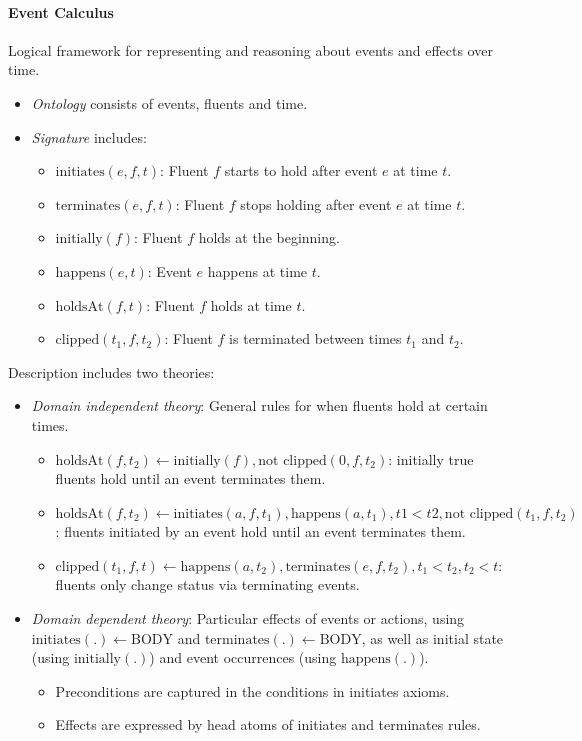 \documentclass[twocolumn,english]{article}
\begin{document}
\paragraph{Event Calculus}

Logical framework for representing and reasoning about events and
effects over time.
\begin{itemize}
\item \emph{Ontology} consists of events, fluents and time.
\item \emph{Signature} includes:
\begin{itemize}
\item $\text{initiates}(e,f,t)$: Fluent $f$ starts to hold after event
$e$ at time $t$.
\item $\text{terminates}(e,f,t)$: Fluent $f$ stops holding after event
$e$ at time $t$.
\item $\text{initially}(f)$: Fluent $f$ holds at the beginning.
\item $\text{happens}(e,t)$: Event $e$ happens at time $t$.
\item $\text{holdsAt}(f,t)$: Fluent $f$ holds at time $t$.
\item $\text{clipped}(t_{1},f,t_{2})$: Fluent $f$ is terminated between
times $t_{1}$ and $t_{2}$.
\end{itemize}
\end{itemize}
Description includes two theories:
\begin{itemize}
\item \emph{Domain independent theory}: General rules for when fluents hold
at certain times.
\begin{itemize}
\item $\text{holdsAt}\left(f,t_{2}\right)\leftarrow\text{initially}\left(f\right),\text{not clipped}\left(0,f,t_{2}\right)$:
initially true fluents hold until an event terminates them.
\item $\text{holdsAt}\left(f,t_{2}\right)\leftarrow\text{initiates}\left(a,f,t_{1}\right),\text{happens}\left(a,t_{1}\right),t1<t2,\text{not clipped}\left(t_{1},f,t_{2}\right)$:
fluents initiated by an event hold until an event terminates them.
\item $\text{clipped}\left(t_{1},f,t\right)\leftarrow\text{happens}\left(a,t_{2}\right),\text{terminates}\left(e,f,t_{2}\right),t_{1}<t_{2},t_{2}<t$:
fluents only change status via terminating events.
\end{itemize}
\item \emph{Domain dependent theory}: Particular effects of events or actions,
using $\text{initiates}(.)\leftarrow\text{BODY}$ and $\text{terminates}(.)\leftarrow\text{BODY}$,
as well as initial state (using $\text{initially}(.)$) and event
occurrences (using $\text{happens}(.)$).
\begin{itemize}
\item Preconditions are captured in the conditions in initiates axioms.
\item Effects are expressed by head atoms of initiates and terminates rules.
\end{itemize}
\end{itemize}
\end{document}

